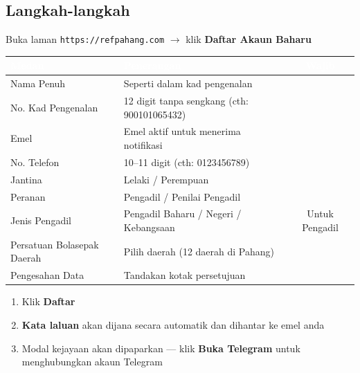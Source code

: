 \documentclass[12pt,a4paper]{report}
\newcommand{\tablemark}{\textcolor{successgreen}{\ding{51}}}
\newcommand{\btn}[1]{\colorbox{primaryblue!10}{\textcolor{primaryblue}{\textbf{#1}}}}
\begin{document}
\subsection{Langkah-langkah}

\begin{stepbox}
Buka laman \texttt{https://refpahang.com} $\rightarrow$ klik \btn{Daftar Akaun Baharu}
\end{stepbox}

\begin{stepbox}
\begin{table}[H]
\centering
{}
\begin{tabularx}{\textwidth}{l X c}
\toprule
\rowcolor{tableheader}
\textcolor{white}{\textbf{Medan}} & \textcolor{white}{\textbf{Penerangan}} & \textcolor{white}{\textbf{Wajib}} \\
\midrule
Nama Penuh & Seperti dalam kad pengenalan & \tablemark \\
No. Kad Pengenalan & 12 digit tanpa sengkang (cth: 900101065432) & \tablemark \\
Emel & Emel aktif untuk menerima notifikasi & \tablemark \\
No. Telefon & 10--11 digit (cth: 0123456789) & \tablemark \\
Jantina & Lelaki / Perempuan & \tablemark \\
Peranan & Pengadil / Penilai Pengadil & \tablemark \\
Jenis Pengadil & Pengadil Baharu / Negeri / Kebangsaan & Untuk Pengadil \\
Persatuan Bolasepak Daerah & Pilih daerah (12 daerah di Pahang) & \tablemark \\
Pengesahan Data & Tandakan kotak persetujuan & \tablemark \\
\bottomrule
\end{tabularx}
\end{table}
\end{stepbox}

\begin{stepbox}
\begin{enumerate}[label=\textcolor{pbnpblue}{\textbf{\arabic*.}}, start=3]
  \item Klik \btn{Daftar}
  \item \textbf{Kata laluan} akan dijana secara automatik dan dihantar ke emel anda
  \item Modal kejayaan akan dipaparkan --- klik \btn{Buka Telegram} untuk menghubungkan akaun Telegram
\end{enumerate}
\end{stepbox}
\end{document}

